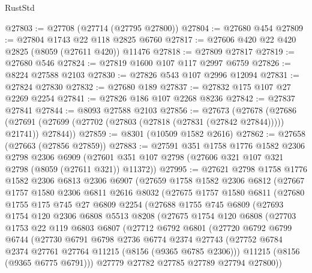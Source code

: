 \begin{lexlean}{RustStd}
\begin{coremodule}
{\begin{coremodule}
{{{{{{{{{{{{{{{{{{{{{{{{{{{{{{{{{{@27803 := @27708 (@27714 (@27795 @27800))
@27804 := @27680 @454
@27809 := @27804 @1743 @22 @118 @2825 @6760
@27817 := @27606 @420 @22 @420 @2825 (@8059 (@27611 @420)) @11476
@27818 := @27809 @27817
@27819 := @27680 @546
@27824 := @27819 @1600 @107 @117 @2997 @6759
@27826 := @8224 @27588 @2103
@27830 := @27826 @543 @107 @2996 @12094
@27831 := @27824 @27830
@27832 := @27680 @189
@27837 := @27832 @175 @107 @27 @2269 @2254
@27841 := @27826 @186 @107 @2268 @8236
@27842 := @27837 @27841
@27844 := @8093 @27588 @2103
@27856 := @27673
    (@27678
      (@27686 (@27691 (@27699 (@27702 (@27803 (@27818 (@27831 (@27842 @27844))))) @21741)) @27844))
@27859 := @8301 (@10509 @1582 @2616)
@27862 := @27658 (@27663 (@27856 @27859))
@27883 := @27591
    @351
    @1758
    @1776
    @1582
    @2306
    @2798
    @2306
    @6909
    (@27601 @351 @107 @2798 (@27606 @321 @107 @321 @2798 (@8059 (@27611 @321)) @11372))
@27995 := @27621
    @2798
    @1758
    @1776
    @1582
    @2306
    @6813
    @2306
    @6907
    (@27659
      @1758
      @1582
      @2306
      @6812
      (@27667
        @1757
        @1580
        @2306
        @6811
        @2616
        @8032
        (@27675
          @1757
          @1580
          @6811
          (@27680
            @1755
            @175
            @745
            @27
            @6809
            @2254
            (@27688
              @1755
              @745
              @6809
              (@27693
                @1754
                @120
                @2306
                @6808
                @5513
                @8208
                (@27675
                  @1754
                  @120
                  @6808
                  (@27703
                    @1753
                    @22
                    @119
                    @6803
                    @6807
                    (@27712
                      @6792
                      @6801
                      (@27720
                        @6792
                        @6799
                        @6744
                        (@27730
                          @6791
                          @6798
                          @2736
                          @6774
                          @2374
                          @27743
                          (@27752 @6784 @2374 @27761 @27764 @11215 (@8156 (@9365 @6785 @2306)))
                          @11215
                          (@8156 (@9365 @6775 @6791)))
                        @27779
                        @27782
                        @27785
                        @27789
                        @27794
                        @27800))
}}}}}}}}}}}}}}}}}}}}}}}}}}}}}}}}}}
\end{coremodule}}
\end{coremodule}
\end{lexlean}
